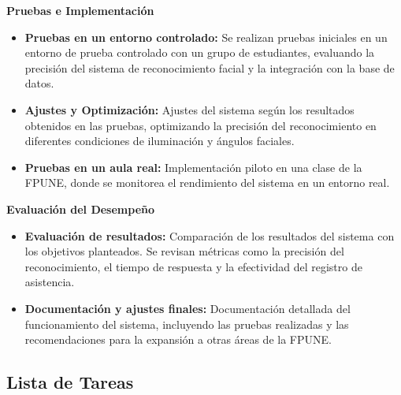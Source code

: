 \textbf{Pruebas e Implementación}

\begin{itemize}
    \item \textbf{Pruebas en un entorno controlado:} Se realizan pruebas iniciales en un entorno de prueba controlado con un grupo de estudiantes, evaluando la precisión del sistema de reconocimiento facial y la integración con la base de datos.

    \item \textbf{Ajustes y Optimización:} Ajustes del sistema según los resultados obtenidos en las pruebas, optimizando la precisión del reconocimiento en diferentes condiciones de iluminación y ángulos faciales.

    \item \textbf{Pruebas en un aula real:} Implementación piloto en una clase de la FPUNE, donde se monitorea el rendimiento del sistema en un entorno real.
\end{itemize}


\textbf{Evaluación del Desempeño}

\begin{itemize}
    \item \textbf{Evaluación de resultados:} Comparación de los resultados del sistema con los objetivos planteados. Se revisan métricas como la precisión del reconocimiento, el tiempo de respuesta y la efectividad del registro de asistencia.

    \item \textbf{Documentación y ajustes finales:} Documentación detallada del funcionamiento del sistema, incluyendo las pruebas realizadas y las recomendaciones para la expansión a otras áreas de la FPUNE.
\end{itemize}

\subsection{Lista de Tareas}

